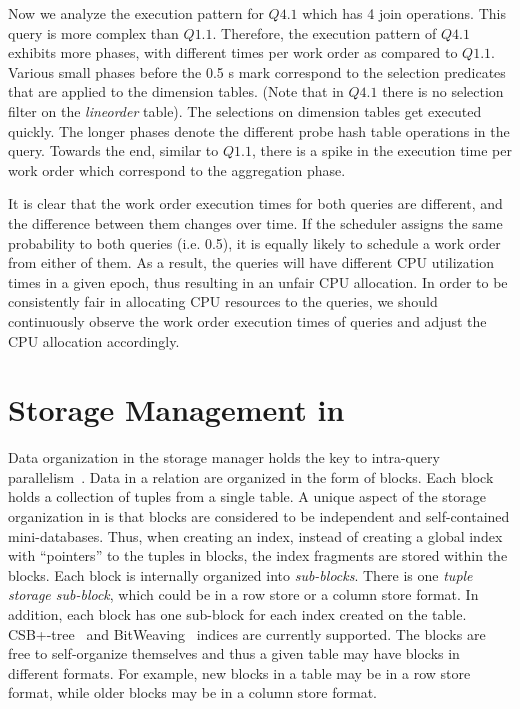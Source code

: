 Now we analyze the execution pattern for $Q4.1$ which has 4 join operations. 
This query is more complex than $Q1.1$.%
Therefore, the execution pattern of $Q4.1$ exhibits more phases, with different times per work order as compared to $Q1.1$.
Various small phases before the 0.5 s mark correspond to the selection predicates that are applied to the dimension tables. (Note that in $Q4.1$ there is no selection filter on the \textit{lineorder} table).
The selections on dimension tables get executed quickly.
The longer phases denote the different probe hash table operations in the query.
Towards the end, similar to $Q1.1$, there is a spike in the execution time per work order which correspond to the aggregation phase.

It is clear that the work order execution times for both queries are different, and the difference between them changes over time. 
If the scheduler assigns the same probability to both queries (i.e. 0.5), it is equally likely to schedule a work order from either of them. 
As a result, the queries will have different CPU utilization times in a given epoch, thus resulting in an unfair CPU allocation. 
In order to be consistently fair in allocating CPU resources to the queries, we should continuously observe the work order execution times of queries and adjust the CPU allocation accordingly. 

\section{Storage Management in \sys{}}\label{apx:storage-manager}
Data organization in the \sys{} storage manager holds the key to intra-query 
parallelism~\cite{qsstorage}. 
Data in a relation are organized in the form of blocks. 
Each block holds a collection of tuples from a single table. 
A unique aspect of the storage organization in \sys{} is that blocks are considered to 
be independent and self-contained mini-databases. 
Thus, when creating an index, instead of creating a global index with 
``pointers'' to the tuples in blocks, the index fragments are stored within the blocks. 
Each block is internally organized into \textit{sub-blocks}. 
There is one \textit{tuple storage sub-block}, which could be in a row store or a 
column store format.
In addition, each block has one sub-block for each index created on the table. 
CSB+-tree~\cite{csb+-tree} and BitWeaving~\cite{bitweaving} 
indices are currently supported. 
The blocks are free to self-organize themselves and thus a given table may have blocks in different formats. 
For example, new blocks in a table may be in a row store format, while older blocks may 
be in a column store format.

